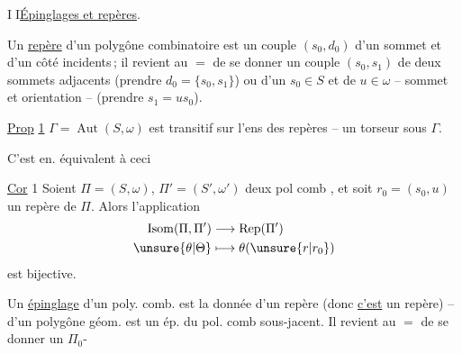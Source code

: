 \textcircled{II}\quad\uline{Épinglages et repères}.

Un \uline{repère} d'un polygône combinatoire est
un couple $(s_0,d_0)$ d'un sommet et d'un côté incidents\,; il revient au $=$ de
se donner un couple $(s_0,s_1)$ de deux
sommets adjacents  (prendre
$d_0=\{s_0,s_1\}$) ou d'un $s_0\in S$ et de $u\in\omega$
-- sommet et orientation -- (prendre $s_1=us_0$).

\uline{Prop} \uline{1} $\Gamma=\operatorname{Aut}(S,\omega)$ est  transitif sur l'ens des repères --   un torseur sous $\Gamma$.

C'est en. équivalent à ceci

\uline{Cor} 1 Soient $\Pi=(S,\omega)$, $\Pi'=(S',\omega')$ deux  pol
comb , et soit $r_0=(s_0,u)$ un repère de
$\Pi$. Alors l'application
\[
\begin{aligned}
\operatorname{Isom}(\Pi,\Pi')&\longrightarrow\operatorname{Rep}(\Pi')\\
\unsure{\theta|\Theta}&\longmapsto\theta(\unsure{r|r_0})
\end{aligned}
\]
est bijective. \unsure{$\vert$}

Un \uline{épinglage} d'un poly. comb. est
la donnée d'un repère (donc \uline{c'est} un
repère) --   d'un polygône géom.
est un ép. du pol. comb sous-jacent.
Il revient au $=$ de  se donner un $\Pi_0$-

